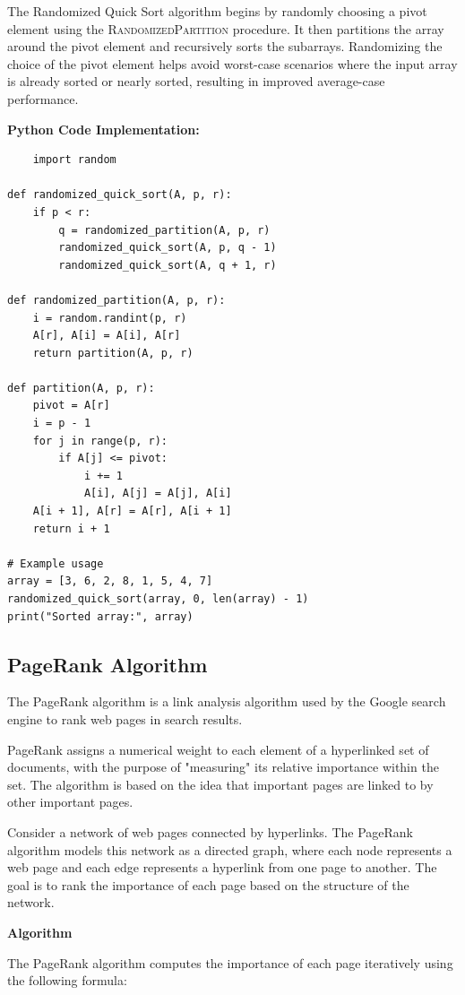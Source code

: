 \documentclass[12pt]{book} %
\begin{document}
The Randomized Quick Sort algorithm begins by randomly choosing a pivot element using the \textsc{RandomizedPartition} procedure. It then partitions the array around the pivot element and recursively sorts the subarrays. Randomizing the choice of the pivot element helps avoid worst-case scenarios where the input array is already sorted or nearly sorted, resulting in improved average-case performance.

\textbf{Python Code Implementation:}
\FloatBarrier
\begin{lstlisting}
    import random

def randomized_quick_sort(A, p, r):
    if p < r:
        q = randomized_partition(A, p, r)
        randomized_quick_sort(A, p, q - 1)
        randomized_quick_sort(A, q + 1, r)

def randomized_partition(A, p, r):
    i = random.randint(p, r)
    A[r], A[i] = A[i], A[r]
    return partition(A, p, r)

def partition(A, p, r):
    pivot = A[r]
    i = p - 1
    for j in range(p, r):
        if A[j] <= pivot:
            i += 1
            A[i], A[j] = A[j], A[i]
    A[i + 1], A[r] = A[r], A[i + 1]
    return i + 1

# Example usage
array = [3, 6, 2, 8, 1, 5, 4, 7]
randomized_quick_sort(array, 0, len(array) - 1)
print("Sorted array:", array)
\end{lstlisting}


\subsection{PageRank Algorithm}
The PageRank algorithm is a link analysis algorithm used by the Google search engine to rank web pages in search results.

PageRank assigns a numerical weight to each element of a hyperlinked set of documents, with the purpose of "measuring" its relative importance within the set. The algorithm is based on the idea that important pages are linked to by other important pages.

Consider a network of web pages connected by hyperlinks. The PageRank algorithm models this network as a directed graph, where each node represents a web page and each edge represents a hyperlink from one page to another. The goal is to rank the importance of each page based on the structure of the network.

\textbf{Algorithm}

The PageRank algorithm computes the importance of each page iteratively using the following formula:
\end{document}
